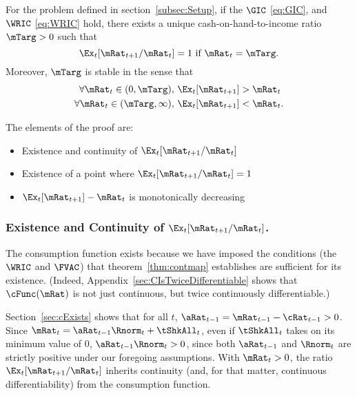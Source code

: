 \documentclass[BufferStockTheory]{subfiles}
\begin{document}
\begin{theorem}
  \label{thm:target} For the problem defined in section~\ref{subsec:Setup}, 
  if the $\GIC$ \eqref{eq:GIC}, and $\WRIC$ \eqref{eq:WRIC} hold, 
  there exists a unique cash-on-hand-to-income ratio $\mTarg>0$ such that
  \begin{equation}  
    \Ex_t [{\mRat}_{t+1}/\mRat_t] = 1 \mbox{~if~} \mRat_t = \mTarg. 
    \label{eq:mTarget}
  \end{equation}
  Moreover, $\mTarg$ is stable in the sense that
  \begin{align}\label{eq:stability}
    \forall {\mRat}_t\in(0,\mTarg),      \,\,& \Ex_t [{\mRat}_{t+1}] > {\mRat}_t  \\
    \forall {\mRat}_t\in(\mTarg,\infty), \,\,& \Ex_t [{\mRat}_{t+1}] < {\mRat}_t. \notag
  \end{align}

\end{theorem}

The elements of the proof are:
\begin{itemize}
\item Existence and continuity of $\Ex_t [{\mRat}_{t+1}/\mRat_t]$
\item Existence of a point where $\Ex_t [{\mRat}_{t+1}/\mRat_t] = 1$
\item $\Ex_t [{\mRat}_{t+1}]-\mRat_{t}$ is monotonically decreasing
\end{itemize}

\subsubsection{Existence and Continuity of $\Ex_t [{\mRat}_{t+1}/\mRat_t]$.}
The consumption function exists because we have imposed the conditions (the $\WRIC$ and $\FVAC$) that theorem~\ref{thm:contmap} establishes are sufficient for its existence.  (Indeed, Appendix~\ref{sec:CIsTwiceDifferentiable} shows that $\cFunc(\mRat)$ is not just continuous, but twice continuously differentiable.)

Section~\ref{sec:cExists} shows that for all $t$, $\aRat_{t-1} = {\mRat}_{t-1} -  \cRat_{t-1} > 0$.  Since ${\mRat}_{t}= {\aRat}_{t-1} \Rnorm_{t} + \tShkAll_{t}$, even if $\tShkAll_{t}$ takes on its minimum value of 0, $\aRat_{t-1} \Rnorm_{t} > 0$, since both $\aRat_{t-1}$ and $\Rnorm_{t}$ are strictly positive under our foregoing assumptions.  With $\mRat_{t} > 0$, the ratio $\Ex_t [{\mRat}_{t+1}/\mRat_t]$ inherits continuity (and, for that matter, continuous differentiability) from the consumption function.
\end{document}
